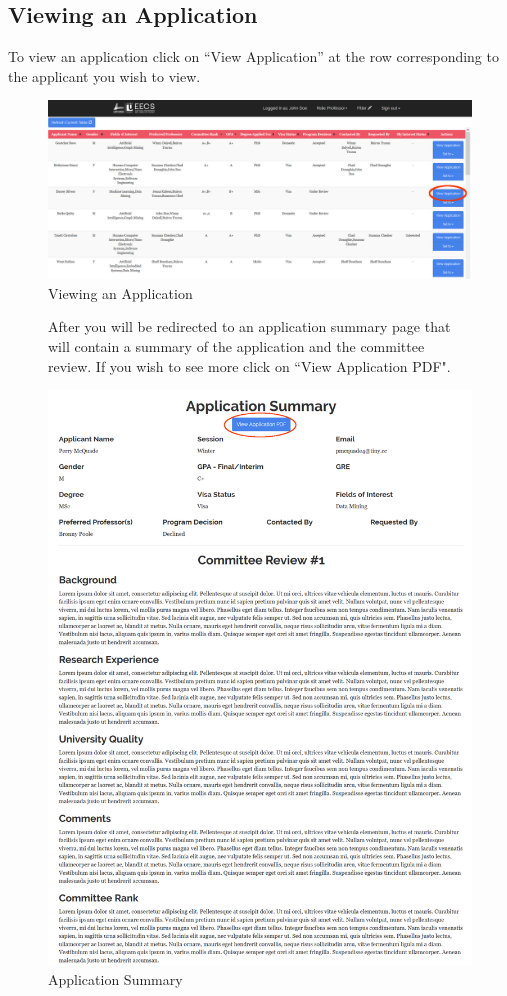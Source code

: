 \documentclass[fontsize=12pt,paper=letter,twoside]{scrartcl}
\begin{document}
\subsection{Viewing an Application}
To view an application click on ``View Application'' at the row corresponding to the applicant you wish to view.
\begin{figure}[!htb]
\begin{center}
\includegraphics[width=.99\textwidth]{images/view_app.png}
\end{center}
\caption{Viewing an Application}
\end{figure}
\begin{figure}[!htb]
After you will be redirected to an application summary page that will contain a summary of the application and the committee review. If you wish to see more click on ``View Application PDF".
\begin{center}
\includegraphics[width=.99\textwidth]{images/viewapp.png}
\end{center}
\caption{Application Summary}
\label{fig:sorted_table}
\end{figure}
\clearpage
\end{document}
